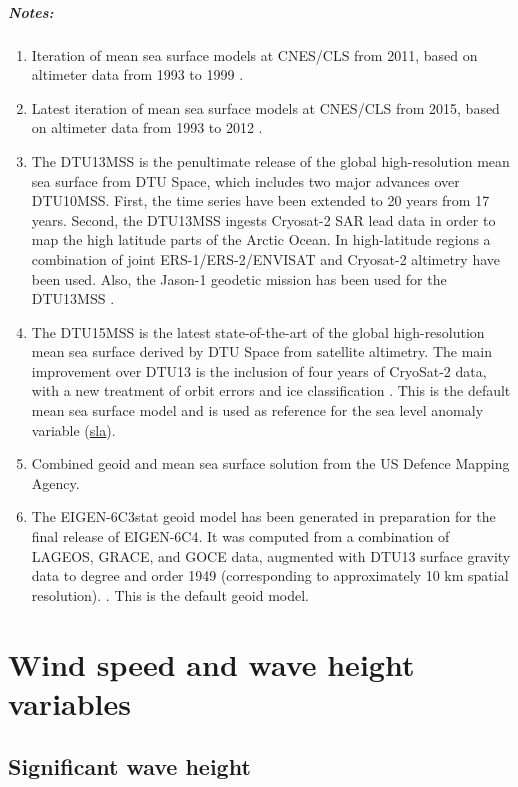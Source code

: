 \documentclass[a4paper,11pt,openany,natbib,nomargin]{thesis}
\makeatletter
\newcommand\var[1]{\url{#1}\index{variables!#1@\protect\url{#1}}}
\newenvironment{notes}[1][Notes:]{\FloatBarrier\paragraph{#1}\begin{enumerate}}{\end{enumerate}}
\makeatother
\begin{document}
\begin{notes}
\item Iteration of mean sea surface models at CNES/CLS from 2011, based on altimeter data from 1993 to 1999 \citep{schaeffer2012}.\label{item:mss_cnescls11}
\item Latest iteration of mean sea surface models at CNES/CLS from 2015, based on altimeter data from 1993 to 2012 \citep{schaeffer2012}.\label{item:mss_cnescls15}
\item The DTU13MSS is the penultimate release of the global high-resolution mean sea surface from DTU Space, which includes two major advances over DTU10MSS. First, the time series have been extended to 20 years from 17 years. Second, the DTU13MSS ingests Cryosat-2 SAR lead data in order to map the high latitude parts of the Arctic Ocean. In high-latitude regions a combination of joint ERS-1/ERS-2/ENVISAT and Cryosat-2 altimetry have been used. Also, the Jason-1 geodetic mission has been used for the DTU13MSS \citep{andersen2013a}.\label{item:mss_dtu13}
\item The DTU15MSS is the latest state-of-the-art of the global high-resolution mean sea surface derived by DTU Space from satellite altimetry. The main improvement over DTU13 is the inclusion of four years of CryoSat-2 data, with a new treatment of orbit errors and ice classification \citep{stenseng2015}. This is the default mean sea surface model and is used as reference for the sea level anomaly variable (\var{sla}).\label{item:mss_dtu15}
\item Combined geoid and mean sea surface solution from the US Defence Mapping Agency\citep{pavlis2012}.
\label{item:geoid_egm2008}
\item The EIGEN-6C3stat geoid model has been generated in preparation for the final release of EIGEN-6C4. It was computed from a combination of LAGEOS, GRACE, and GOCE data, augmented with DTU13 surface gravity data to degree and order 1949 (corresponding to approximately 10 km spatial resolution). \citep{foerste2013,shako2014}. This is the default geoid model.\label{item:geoid_eigen6}
\end{notes}

\chapter{Wind speed and wave height variables}
\section{Significant wave height}
\label{var:swh}
\end{document}
